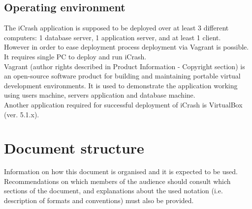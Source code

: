 \subsection{Operating environment}
The iCrash application is supposed to be deployed over at least 3 different
computers: 1 database server, 1 application server, and at least 1 client.\\

However in order to ease deployment process deployment via Vagrant is possible.
It requires single PC to deploy and run iCrash.\\

Vagrant (author rights described in Product Information - Copyright section) is
an open-source software product for building and maintaining portable virtual
development environments. It is used to demonstrate the application working using users machine, servers application and database machine.\\

Another application required for successful deployment of iCrash is VirtualBox
(ver. 5.1.x). \\

\section{Document structure}  
Information on how this document is organised and it is expected to be
used. Recommendations on which members of the audience
should consult which sections of the document, and explanations about the used
notation (i.e. description of formats and conventions) must also be provided.

